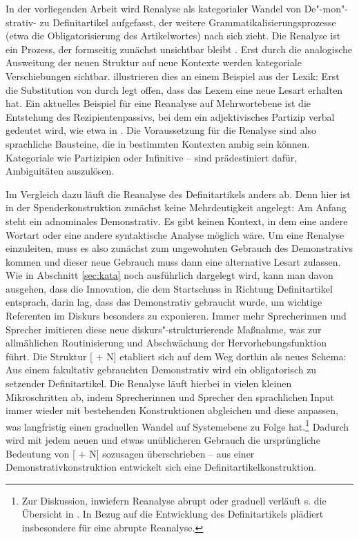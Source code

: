 In der vorliegenden Arbeit wird Renalyse als kategorialer Wandel von De"-mon"-strativ- zu Definitartikel aufgefasst, der weitere Grammatikalisierungsprozesse (etwa die Obligatorisierung des Artikelwortes) nach sich zieht. Die Renalyse ist ein Prozess, der formseitig zunächst unsichtbar bleibt \parencite[58]{Langacker1977}. Erst durch die analogische Ausweitung der neuen Struktur auf neue Kontexte werden kategoriale Verschiebungen sichtbar. \textcite[50]{Hopper2006} illustrieren dies an einem Beispiel aus der Lexik: Erst die Substitution von  durch  legt offen, dass das Lexem  eine neue Lesart \parencite[urspr. ][389]{Kluge2011} erhalten hat. Ein aktuelles Beispiel für eine Reanalyse auf Mehrwortebene ist die Entstehung des Rezipientenpassivs, bei dem ein adjektivisches Partizip verbal gedeutet wird, wie etwa in  \parencite[152f.]{Szczepaniak2011a}.
Die Voraussetzung für die Renalyse sind also sprachliche Bausteine, die in bestimmten Kontexten ambig sein können. Kategoriale  wie Partizipien oder Infinitive \parencite[vgl. die Renalyse des -Progressivs -- aus einem nominalen wird ein verbaler Infinitiv, s.][]{Flick2013} -- sind prädestiniert dafür, Ambiguitäten auszulösen. 

Im Vergleich dazu läuft die Reanalyse des Definitartikels anders ab. Denn hier ist in der Spenderkonstruktion zunächst keine Mehrdeutigkeit angelegt: Am Anfang steht  ein adnominales Demonstrativ. Es gibt keinen Kontext, in dem eine andere Wortart oder eine andere syntaktische Analyse möglich wäre. Um eine Renalyse einzuleiten, muss es also zunächst zum ungewohnten Gebrauch des Demonstrativs kommen und dieser neue Gebrauch muss dann eine alternative Lesart zulassen. Wie in Abschnitt \ref{sec:kata} noch ausführlich dargelegt wird, kann man davon ausgehen, dass die Innovation, die dem Startschuss in Richtung Definitartikel entsprach, darin lag, dass das Demonstrativ  gebraucht wurde, um wichtige Referenten im Diskurs besonders zu exponieren. Immer mehr Sprecherinnen und Sprecher imitieren diese neue diskurs"-strukturierende Maßnahme, was zur allmählichen Routinisierung und Abschwächung der Hervorhebungsfunktion führt. Die Struktur [ + N] etabliert sich auf dem Weg dorthin als neues Schema: Aus einem fakultativ gebrauchten Demonstrativ wird ein obligatorisch zu setzender Definitartikel. Die Renalyse läuft hierbei in vielen kleinen Mikroschritten ab, indem Sprecherinnen und Sprecher den sprachlichen Input immer wieder mit bestehenden Konstruktionen abgleichen und diese anpassen, was langfristig einen graduellen Wandel auf Systemebene zu Folge hat.\footnote{Zur Diskussion, inwiefern Reanalyse abrupt oder graduell verläuft s. die Übersicht in \textcite[75]{Traugott2013}. In Bezug auf die Entwicklung des Definitartikels plädiert insbesondere \textcite{Schlachter2015} für eine abrupte Reanalyse.} 
Dadurch wird mit jedem neuen und etwas unüblicheren Gebrauch die ursprüngliche Bedeutung von [ + N] sozusagen überschrieben -- aus einer Demonstrativkonstruktion entwickelt sich eine Definitartikelkonstruktion.

